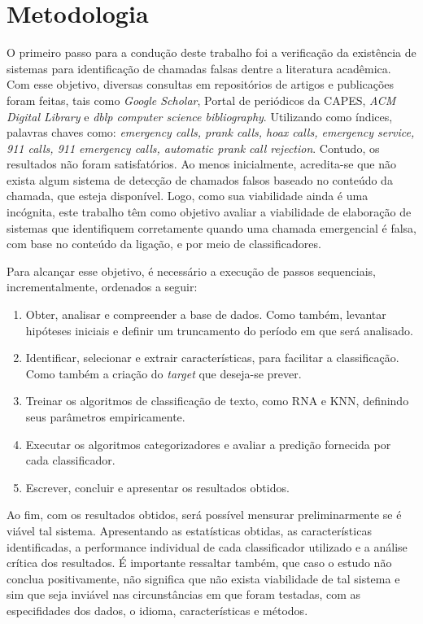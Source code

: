 \chapter{Metodologia}
O primeiro passo para a condução deste trabalho foi a verificação da existência de sistemas para identificação de chamadas falsas dentre a literatura acadêmica. Com esse objetivo, diversas consultas em repositórios de artigos e publicações foram feitas, tais como \textit{Google Scholar}, Portal de periódicos da CAPES, \textit{ACM Digital Library} e \textit{dblp computer science bibliography}. Utilizando como índices, palavras chaves como: \textit{emergency calls, prank calls, hoax calls, emergency service, 911 calls, 911 emergency calls, automatic prank call rejection}. Contudo, os resultados não foram satisfatórios. Ao menos inicialmente, acredita-se que não exista algum sistema de detecção de chamados falsos baseado no conteúdo da chamada, que esteja disponível. Logo, como sua viabilidade ainda é uma incógnita, este trabalho têm como objetivo avaliar a viabilidade de elaboração de sistemas que identifiquem corretamente quando uma chamada emergencial é falsa, com base no conteúdo da ligação, e por meio de classificadores.

Para alcançar esse objetivo, é necessário a execução de passos sequenciais, incrementalmente, ordenados a seguir: 
\begin{enumerate}
    \item Obter, analisar e compreender a base de dados. Como também, levantar hipóteses iniciais e definir um truncamento do período em que será analisado.
    \item Identificar, selecionar e extrair características, para facilitar a classificação. Como também a criação do \textit{target} que deseja-se prever.
    \item Treinar os algoritmos de classificação de texto, como RNA e KNN, definindo seus parâmetros empiricamente.
    \item Executar os algoritmos categorizadores e avaliar a predição fornecida por cada classificador.
    \item Escrever, concluir e apresentar os resultados obtidos.
\end{enumerate}

Ao fim, com os resultados obtidos, será possível mensurar preliminarmente se é viável tal sistema. Apresentando as estatísticas obtidas, as características identificadas, a performance individual de cada classificador utilizado e a análise crítica dos resultados. É importante ressaltar também, que caso o estudo não conclua positivamente, não significa que não exista viabilidade de tal sistema e sim que seja inviável nas circunstâncias em que foram testadas, com as especifidades dos dados, o idioma, características e métodos.

